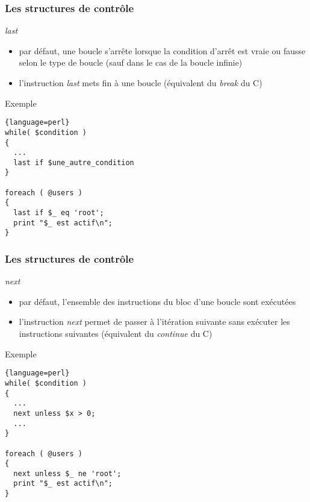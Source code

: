 \begin{frame}[fragile]
  \frametitle{Les structures de contrôle}

  \begin{block}{\textit{last}}
    \begin{itemize}
    \item par défaut, une boucle s'arrête lorsque la condition d'arrêt est vraie
      ou fausse selon le type de boucle (sauf dans le cas de la boucle infinie)
    \item l'instruction \textit{last} mets fin à une boucle (équivalent du
      \textit{break} du C)
    \end{itemize}
  \end{block}

  \begin{exampleblock}{Exemple}
    \begin{lstlisting}{language=perl}
while( $condition )
{
  ...
  last if $une_autre_condition
}

foreach ( @users )
{
  last if $_ eq 'root';
  print "$_ est actif\n";
}
    \end{lstlisting}
  \end{exampleblock}

\end{frame}

\begin{frame}[fragile]
  \frametitle{Les structures de contrôle}

  \begin{block}{\textit{next}}
    \begin{itemize}
    \item par défaut, l'ensemble des instructions du bloc d'une boucle sont
      exécutées
    \item l'instruction \textit{next} permet de passer à l'itération
      suivante sans exécuter les instructions suivantes (équivalent du
      \textit{continue} du C)
    \end{itemize}
  \end{block}

  \begin{exampleblock}{Exemple}
    \begin{lstlisting}{language=perl}
while( $condition )
{
  ...
  next unless $x > 0;
  ...
}

foreach ( @users )
{
  next unless $_ ne 'root';
  print "$_ est actif\n";
}
    \end{lstlisting}
  \end{exampleblock}

\end{frame}

